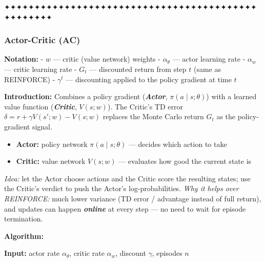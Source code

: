 \documentclass[11pt]{article}
\providecommand{\tightlist}{%
      \setlength{\itemsep}{0pt}\setlength{\parskip}{0pt}}
\begin{document}
    ✦✦✦✦✦✦✦✦✦✦✦✦✦✦✦✦✦✦✦✦✦✦✦✦✦✦✦✦✦✦✦✦✦✦✦✦✦✦✦✦✦✦✦✦✦✦✦✦✦✦

    \clearpage

\label{actor-critic}

    \subsubsection{Actor-Critic (AC)}\label{actor-critic-ac}

    \textbf{Notation:} - \(w\) --- critic (value network) weights -
\(\alpha_\theta\) --- actor learning rate - \(\alpha_w\) --- critic
learning rate - \(G_t\) --- discounted return from step \(t\) (same as
REINFORCE) - \(\gamma^t\) --- discounting applied to the policy gradient
at time \(t\)

    \label{intro-4-2}

    \textbf{Introduction:} Combines a policy gradient
(\textbf{\emph{Actor}}, \(\pi(a\mid s;\theta)\)) with a learned value
function (\textbf{\emph{Critic}}, \(V(s;w)\)). The Critic's TD error
\(\delta = r + \gamma V(s';w) - V(s;w)\) replaces the Monte Carlo return
\(G_t\) as the policy-gradient signal.

\begin{itemize}
\tightlist
\item
  \textbf{Actor:} policy network \(\pi(a \mid s;\theta)\) --- decides
  which action to take
\item
  \textbf{Critic:} value network \(V(s;w)\) --- evaluates how good the
  current state is
\end{itemize}

\emph{Idea:} let the Actor choose actions and the Critic score the
resulting states; use the Critic's verdict to push the Actor's
log-probabilities. \emph{Why it helps over REINFORCE:} much lower
variance (TD error / advantage instead of full return), and updates can
happen \textbf{\emph{online}} at every step --- no need to wait for
episode termination.

    \textbf{Algorithm:}

\textbf{Input:} actor rate \(\alpha_\theta\), critic rate \(\alpha_w\),
discount \(\gamma\), episodes \(n\)
\end{document}

